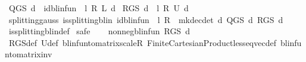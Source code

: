 \begin{isabellebody}
%
\endisadelimproof
%
\isadelimdocument
%
\endisadelimdocument
%
\isatagdocument
%
\isamarkuptrue%
%
\endisatagdocument
{\isafolddocument}%
%
\isadelimdocument
%
\endisadelimdocument
{}\isamarkupfalse%
\ {\isachardoublequoteopen}Q{\isacharunderscore}{\kern0pt}GS\ d\ {\isacharequal}{\kern0pt}\ id{\isacharunderscore}{\kern0pt}blinfun\ {\isacharminus}{\kern0pt}\ l\ {\isacharasterisk}{\kern0pt}\isactrlsub R\ {\isasymP}\isactrlsub L\ d{\isachardoublequoteclose}\isanewline
{}\isamarkupfalse%
\ {\isachardoublequoteopen}R{\isacharunderscore}{\kern0pt}GS\ d\ {\isacharequal}{\kern0pt}\ l\ {\isacharasterisk}{\kern0pt}\isactrlsub R\ {\isasymP}\isactrlsub U\ d{\isachardoublequoteclose}\isanewline
\isanewline
{}\isamarkupfalse%
\ splitting{\isacharunderscore}{\kern0pt}gauss{\isacharcolon}{\kern0pt}\ {\isachardoublequoteopen}is{\isacharunderscore}{\kern0pt}splitting{\isacharunderscore}{\kern0pt}blin\ {\isacharparenleft}{\kern0pt}id{\isacharunderscore}{\kern0pt}blinfun\ {\isacharminus}{\kern0pt}\ l\ {\isacharasterisk}{\kern0pt}\isactrlsub R\ {\isasymP}\ {\isacharparenleft}{\kern0pt}mk{\isacharunderscore}{\kern0pt}dec{\isacharunderscore}{\kern0pt}det\ d{\isacharparenright}{\kern0pt}{\isacharparenright}{\kern0pt}\ {\isacharparenleft}{\kern0pt}Q{\isacharunderscore}{\kern0pt}GS\ d{\isacharparenright}{\kern0pt}\ {\isacharparenleft}{\kern0pt}R{\isacharunderscore}{\kern0pt}GS\ d{\isacharparenright}{\kern0pt}{\isachardoublequoteclose}\isanewline
%
\isadelimproof
\ \ %
\endisadelimproof
%
\isatagproof
{}\isamarkupfalse%
\ is{\isacharunderscore}{\kern0pt}splitting{\isacharunderscore}{\kern0pt}blin{\isacharunderscore}{\kern0pt}def{\isacharprime}{\kern0pt}\isanewline
{}\isamarkupfalse%
\ safe\isanewline
\ \ \isamarkupfalse%
\ {\isachardoublequoteopen}nonneg{\isacharunderscore}{\kern0pt}blinfun\ {\isacharparenleft}{\kern0pt}R{\isacharunderscore}{\kern0pt}GS\ d{\isacharparenright}{\kern0pt}{\isachardoublequoteclose}\isanewline
\ \ \ \ \isamarkupfalse%
\ R{\isacharunderscore}{\kern0pt}GS{\isacharunderscore}{\kern0pt}def\ {\isasymP}\isactrlsub U{\isacharunderscore}{\kern0pt}def\ blinfun{\isacharunderscore}{\kern0pt}to{\isacharunderscore}{\kern0pt}matrix{\isacharunderscore}{\kern0pt}scaleR\ Finite{\isacharunderscore}{\kern0pt}Cartesian{\isacharunderscore}{\kern0pt}Product{\isachardot}{\kern0pt}less{\isacharunderscore}{\kern0pt}eq{\isacharunderscore}{\kern0pt}vec{\isacharunderscore}{\kern0pt}def\ blinfun{\isacharunderscore}{\kern0pt}to{\isacharunderscore}{\kern0pt}matrix{\isacharunderscore}{\kern0pt}inv\isanewline

\end{isabellebody}
